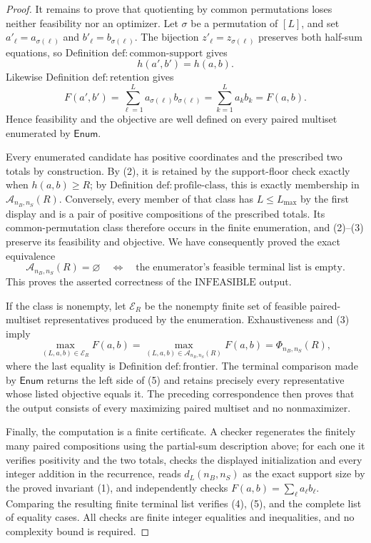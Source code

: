 \documentclass{article}
\begin{document}
\begin{proof}
It remains to prove that quotienting by common permutations loses neither feasibility nor an optimizer.  Let \(\sigma\) be a permutation of \([L]\), and set \(a'_\ell=a_{\sigma(\ell)}\) and \(b'_\ell=b_{\sigma(\ell)}\).  The bijection \(z'_{\ell}=z_{\sigma(\ell)}\) preserves both half-sum equations, so Definition \(\mathrm{def{:}common\text{-}support}\) gives
\[
  h(a',b')=h(a,b).
\]
Likewise Definition \(\mathrm{def{:}retention}\) gives
\[
  F(a',b')=\sum_{\ell=1}^{L}a_{\sigma(\ell)}b_{\sigma(\ell)}
           =\sum_{k=1}^{L}a_kb_k=F(a,b).                         \tag{3}
\]
Hence feasibility and the objective are well defined on every paired multiset enumerated by \(\mathsf{Enum}\).

Every enumerated candidate has positive coordinates and the prescribed two totals by construction.  By (2), it is retained by the support-floor check exactly when \(h(a,b)\ge R\); by Definition \(\mathrm{def{:}profile\text{-}class}\), this is exactly membership in \(\mathcal A_{n_B,n_S}(R)\).  Conversely, every member of that class has \(L\le L_{\max}\) by the first display and is a pair of positive compositions of the prescribed totals.  Its common-permutation class therefore occurs in the finite enumeration, and (2)--(3) preserve its feasibility and objective.  We have consequently proved the exact equivalence
\[
 \mathcal A_{n_B,n_S}(R)=\varnothing
 \quad\Longleftrightarrow\quad
 \text{the enumerator's feasible terminal list is empty}.       \tag{4}
\]
This proves the asserted correctness of the \(\mathrm{INFEASIBLE}\) output.

If the class is nonempty, let \(\mathscr E_R\) be the nonempty finite set of feasible paired-multiset representatives produced by the enumeration.  Exhaustiveness and (3) imply
\[
 \max_{(L,a,b)\in\mathscr E_R}F(a,b)
 =\max_{(L,a,b)\in\mathcal A_{n_B,n_S}(R)}F(a,b)
 =\Phi_{n_B,n_S}(R),                                             \tag{5}
\]
where the last equality is Definition \(\mathrm{def{:}frontier}\).  The terminal comparison made by \(\mathsf{Enum}\) returns the left side of (5) and retains precisely every representative whose listed objective equals it.  The preceding correspondence then proves that the output consists of every maximizing paired multiset and no nonmaximizer.

Finally, the computation is a finite certificate.  A checker regenerates the finitely many paired compositions using the partial-sum description above; for each one it verifies positivity and the two totals, checks the displayed initialization and every integer addition in the recurrence, reads \(d_L(n_B,n_S)\) as the exact support size by the proved invariant (1), and independently checks \(F(a,b)=\sum_\ell a_\ell b_\ell\).  Comparing the resulting finite terminal list verifies (4), (5), and the complete list of equality cases.  All checks are finite integer equalities and inequalities, and no complexity bound is required.


\end{proof}
\end{document}
